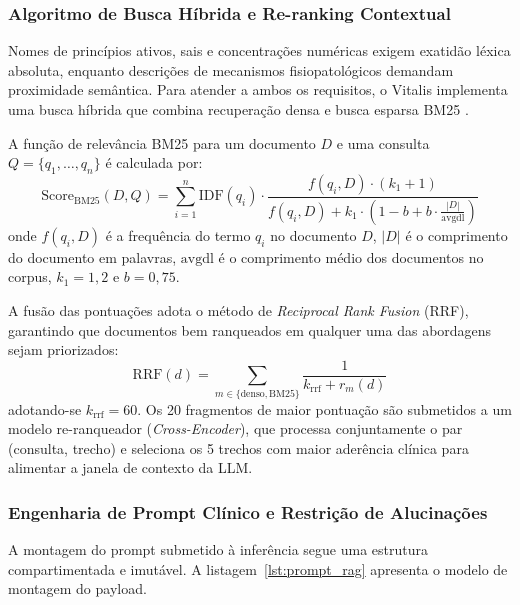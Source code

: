 \subsubsection{Algoritmo de Busca Híbrida e Re-ranking Contextual}
Nomes de princípios ativos, sais e concentrações numéricas exigem exatidão léxica absoluta, enquanto descrições de mecanismos fisiopatológicos demandam proximidade semântica. Para atender a ambos os requisitos, o Vitalis implementa uma busca híbrida que combina recuperação densa e busca esparsa BM25 \cite{robertson_bm25:2009}.

A função de relevância BM25 para um documento $D$ e uma consulta $Q = \{q_1, \dots, q_n\}$ é calculada por:
\begin{equation}
    \text{Score}_{\text{BM25}}(D, Q) = \sum_{i=1}^{n} \text{IDF}(q_i) \cdot \frac{f(q_i, D) \cdot (k_1 + 1)}{f(q_i, D) + k_1 \cdot \left(1 - b + b \cdot \frac{|D|}{\text{avgdl}}\right)}
\end{equation}
onde $f(q_i, D)$ é a frequência do termo $q_i$ no documento $D$, $|D|$ é o comprimento do documento em palavras, $\text{avgdl}$ é o comprimento médio dos documentos no corpus, $k_1 = 1{,}2$ e $b = 0{,}75$.

A fusão das pontuações adota o método de \textit{Reciprocal Rank Fusion} (RRF), garantindo que documentos bem ranqueados em qualquer uma das abordagens sejam priorizados:
\begin{equation}
    \text{RRF}(d) = \sum_{m \in \{\text{denso}, \text{BM25}\}} \frac{1}{k_{\text{rrf}} + r_m(d)}
\end{equation}
adotando-se $k_{\text{rrf}} = 60$. Os 20 fragmentos de maior pontuação são submetidos a um modelo re-ranqueador (\textit{Cross-Encoder}), que processa conjuntamente o par (consulta, trecho) e seleciona os 5 trechos com maior aderência clínica para alimentar a janela de contexto da LLM.

\subsubsection{Engenharia de Prompt Clínico e Restrição de Alucinações}
A montagem do prompt submetido à inferência segue uma estrutura compartimentada e imutável. A listagem~\ref{lst:prompt_rag} apresenta o modelo de montagem do payload.

